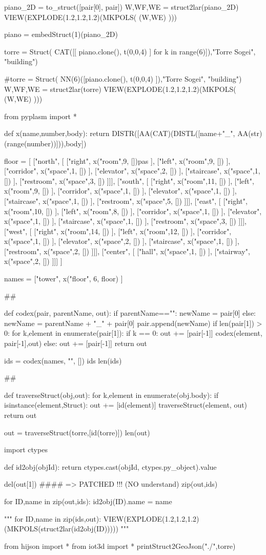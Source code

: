 piano_2D = to_struct([pair[0], pair])
W,WF,WE = struct2lar(piano_2D)
VIEW(EXPLODE(1.2,1.2,1.2)(MKPOLS( (W,WE) )))

piano = embedStruct(1)(piano_2D)


torre = Struct( CAT([[ piano.clone(), t(0,0,4) ] for k in range(6)]),"Torre Sogei", "building")

#torre = Struct( NN(6)([piano.clone(), t(0,0,4) ]),"Torre Sogei", "building")
W,WF,WE = struct2lar(torre)
VIEW(EXPLODE(1.2,1.2,1.2)(MKPOLS( (W,WE) )))


from pyplasm import *

def x(name,number,body):
    return DISTR([AA(CAT)(DISTL([name+"_",
                 AA(str)(range(number))])),body])


floor = [
	["north", [
		["right", x("room",9, [])pas ],
     	["left", x("room",9, []) ],
		["corridor", x("space",1, []) ],
		["elevator", x("space",2, []) ],
		["staircase", x("space",1, []) ],
		["restroom", x("space",3, []) ]]],
	["south", [
	 	["right", x("room",11, []) ],
		["left", x("room",9, []) ],
		["corridor", x("space",1, []) ],
		["elevator", x("space",1, []) ],
		["staircase", x("space",1, []) ],
		["restroom", x("space",5, []) ]]],
	["east", [
	 	["right", x("room",10, []) ],
		["left", x("room",8, []) ],
		["corridor", x("space",1, []) ],
		["elevator", x("space",1, []) ],
		["staircase", x("space",1, []) ],
		["restroom", x("space",3, []) ]]],
	["west", [
	 	["right", x("room",14, []) ],
		["left", x("room",12, []) ],
		["corridor", x("space",1, []) ],
		["elevator", x("space",2, []) ],
		["staircase", x("space",1, []) ],
		["restroom", x("space",2, []) ]]],
	["center", [
	 	["hall", x("space",1, []) ],
		["stairway", x("space",2, []) ]]]
	]

names = ["tower", x("floor", 6, floor) ]

##

def codex(pair, parentName, out):
	if parentName=="": newName = pair[0]
	else: newName = parentName + "_" + pair[0]
	pair.append(newName)
	if len(pair[1]) > 0:
		for k,element in enumerate(pair[1]):
			if k == 0: out += [pair[-1]]
			codex(element, pair[-1],out)
	else: out += [pair[-1]]
	return out
	
ids = codex(names, "", [])
ids
len(ids)


##

def traverseStruct(obj,out):
    for k,element in enumerate(obj.body):
        if isinstance(element,Struct): 
            out += [id(element)]
            traverseStruct(element, out)
    return out

out = traverseStruct(torre,[id(torre)])
len(out)

import ctypes

def id2obj(objId):
	return ctypes.cast(objId, ctypes.py_object).value
	
del(out[1])	 #### => PATCHED !!! (NO understand)
zip(out,ids)

for ID,name in zip(out,ids):
    id2obj(ID).name = name

"""
for ID,name in zip(ids,out):
	VIEW(EXPLODE(1.2,1.2,1.2)(MKPOLS(struct2lar(id2obj(ID)))))
"""

from hijson import *
from iot3d import *
printStruct2GeoJson("./",torre)





